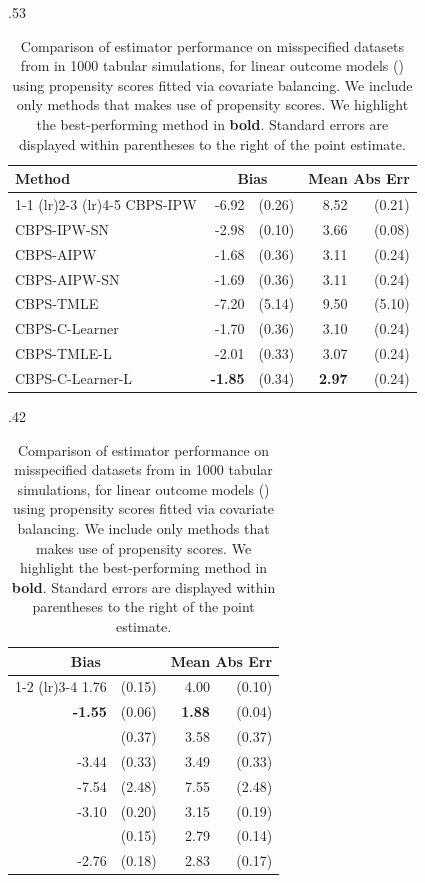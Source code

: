 \ifdefined\response\newpage\newpage\clearpage\pagebreak\else\fi
\label{sec:linear_cbps_ks}
\begin{table}[t]
\footnotesize
\centering
\hfill
\begin{subtable}{.53\linewidth}
\centering
\caption{$N=200$} %
\begin{tabular}{lrrrr}
\toprule
 Method & \multicolumn{2}{c}{Bias} & \multicolumn{2}{c}{Mean Abs Err} \\
\cmidrule(lr){1-1}
\cmidrule(lr){2-3}
\cmidrule(lr){4-5}
CBPS-IPW & -6.92 & (0.26) & 8.52 & (0.21) \\
CBPS-IPW-SN & -2.98 & (0.10) & 3.66 & (0.08) \\
\greymidrule
CBPS-AIPW & -1.68 & (0.36) & 3.11 & (0.24) \\
CBPS-AIPW-SN &  -1.69 & (0.36) & 3.11 & (0.24) \\ 
CBPS-TMLE &  -7.20 & (5.14) & 9.50 & (5.10) \\ 
CBPS-C-Learner &  -1.70 & (0.36) & 3.10 & (0.24) \\ 
\greymidrule
CBPS-TMLE-L & -2.01 & (0.33) & 3.07 & (0.24) \\ 
CBPS-C-Learner-L & \textbf{-1.85} & (0.34) & \textbf{2.97} & (0.24) \\ 
\bottomrule
\end{tabular}
\end{subtable}
\hspace{-3.15em}
\begin{subtable}{.42\linewidth}
\centering
\caption{$N=1000$} %
\begin{tabular}{rrrr}
\toprule
 \multicolumn{2}{c}{Bias} & \multicolumn{2}{c}{Mean Abs Err} \\
\cmidrule(lr){1-2}
\cmidrule(lr){3-4}
1.76 & (0.15) & 4.00 & (0.10) \\
\textbf{-1.55} & (0.06) & \textbf{1.88} & (0.04) \\
\greymidrule
-3.54 & (0.37) & 3.58 & (0.37) \\ 
-3.44 & (0.33) & 3.49 & (0.33) \\ 
-7.54 & (2.48) & 7.55 & (2.48) \\
-3.10 & (0.20) & 3.15 & (0.19) \\ 
\greymidrule
-2.76 & (0.15) & 2.79 & (0.14) \\ 
-2.76 & (0.18) & 2.83 & (0.17) \\ 
\bottomrule
\end{tabular}
\end{subtable}
\hfill
\hspace*{\fill}
\caption{%
Comparison of estimator performance on misspecified datasets from \citet{KangSc07} in 1000 tabular simulations, for linear outcome models () using propensity scores fitted via covariate balancing. We include only methods that makes use of propensity scores.  We highlight the best-performing method in \textbf{bold}. Standard errors are displayed within parentheses to the right of the point estimate.
}
    \label{tb:linear_cbps}
\end{table}

